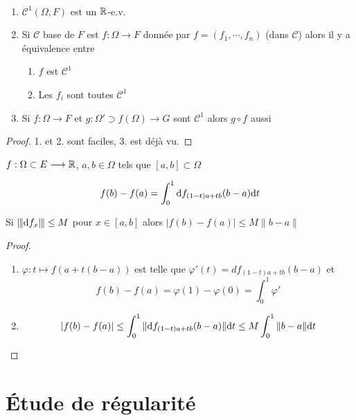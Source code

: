 \begin{prop} ~
    \begin{enumerate}
        \item $\mathcal C^1(\Omega, F)$ est un $\mathbb R$-e.v.
        \item Si $\mathcal C$ base de $F$ est $f:\Omega\longrightarrow F$ donnée par $f=(f_1, \cdots, f_n)$ (dans $\mathcal C$) alors il y a équivalence entre \begin{enumerate}
            \item $f$ est $\mathcal C^1$
            \item Les $f_i$ sont toutes $\mathcal C^1$
        \end{enumerate}
    \item Si $f:\Omega\longrightarrow F$ et $g: \Omega'\supset f(\Omega)\longrightarrow G$ sont $\mathcal C^1$ alors $g\circ f$ aussi
\end{enumerate}
\end{prop}

\begin{proof}
    1. et 2. sont faciles, 3. est déjà vu.
\end{proof}

\begin{thm}
    \Hyp $f:\Omega\subset E\longrightarrow \mathbb R$, $a,b\in\Omega$ tels que $[a, b]\subset \Omega$
    \begin{concenum}
    \item \[ f(b)-f(a)=\int_0^1\mathrm df_{(1-t)a+tb}(b-a)\mathrm{d} t\]
    \item Si $\|\hspace{-1pt}| \mathrm{d} f_x\|\hspace{-1pt}|\leq M$ pour $x\in[a, b]$ alors $|f(b)-f(a)|\leq M\|b-a\|$
    \end{concenum}
\end{thm}

\begin{proof}
    \begin{enumerate}
        \item $\varphi:t\longmapsto f(a+t(b-a))$ est telle que $\varphi'(t)=df_{(1-t)a+tb}(b-a)$ et \[
                f(b)-f(a)=\varphi(1)-\varphi(0)=\int_0^1\varphi'
            \]
        \item \[
                |f(b)-f(a)|\leq \int_0^1\|\mathrm{d} f_{(1-t)a+tb}(b-a)\|\mathrm{d} t\leq M\int_0^1\|b-a\|\mathrm{d} t
            \]
    \end{enumerate}
\end{proof}

\section{Étude de régularité}

